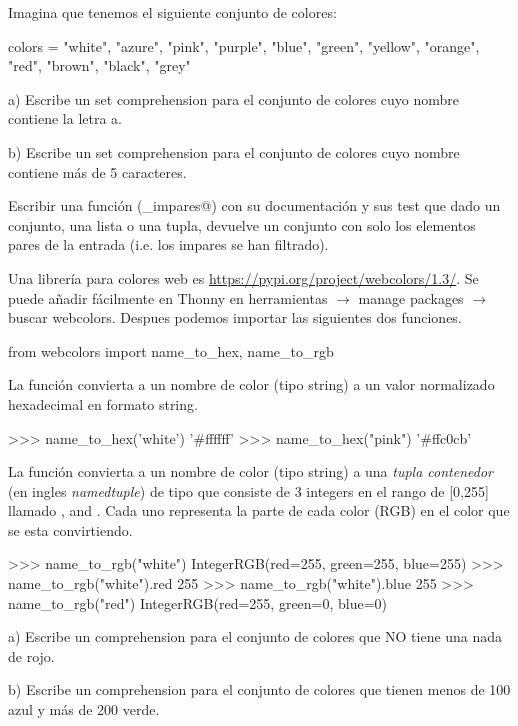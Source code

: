 \begin{exercise}
Imagina que tenemos el siguiente conjunto de colores:

\begin{python}
colors = {"white", "azure", "pink", "purple", "blue", "green", 
"yellow", "orange", "red", "brown", "black", "grey"
 }
\end{python}

a) Escribe un set comprehension para el conjunto de colores
cuyo nombre contiene la letra a.

b) Escribe un set comprehension para el conjunto de colores
cuyo nombre contiene más de 5 caracteres.

\end{exercise}

\begin{exercise}
Escribir una función (\verb@filter_impares@) con su documentación y sus test que dado un conjunto, una lista o una tupla, devuelve un conjunto con solo los elementos pares de la entrada (i.e. los impares se han filtrado).
\end{exercise}


\begin{exercise}
Una librería para colores web es \url{https://pypi.org/project/webcolors/1.3/}. Se puede añadir fácilmente en Thonny en 
herramientas $\rightarrow$ manage packages $\rightarrow$ buscar webcolors. Despues podemos importar las siguientes dos funciones.

\begin{python}
from webcolors import name_to_hex, name_to_rgb
\end{python}

La función  convierta a un nombre de color (tipo string) a un valor normalizado hexadecimal en formato string.

\begin{python}
>>> name_to_hex('white')
'#ffffff'
>>> name_to_hex("pink")
'#ffc0cb'
\end{python}

La función  convierta a un nombre de color (tipo string) a una {\em tupla contenedor} (en ingles {\em namedtuple}) de tipo 
 que consiste de 3 integers en el rango de [0,255] llamado 
,   and . Cada uno representa la parte de cada color (RGB) en el color que se esta convirtiendo.


\begin{python}
>>> name_to_rgb("white")
IntegerRGB(red=255, green=255, blue=255)
>>> name_to_rgb("white").red
255
>>> name_to_rgb("white").blue
255
>>> name_to_rgb("red")
IntegerRGB(red=255, green=0, blue=0)
\end{python}

a) Escribe un comprehension para el conjunto de colores
que NO tiene una nada de rojo.


b) Escribe un comprehension para el conjunto de colores
que tienen menos de 100 azul y más de 200 verde.
\end{exercise}




